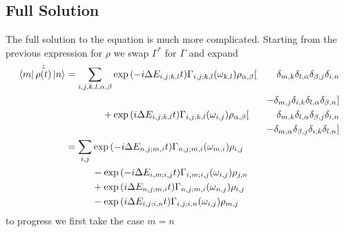 \subsection{Full Solution}
The full solution to the equation is
much more complicated. Starting from the
previous expression for \(\rho \) we
swap \(\Gamma^*\) for \(\Gamma \) and expand
\begin{align}
    \bra{m}\dot{\hat{\rho{}(t)}} \ket{n} & = \begin{aligned}[t]
        \sum_{i,j,k, l, \alpha, \beta} &
        \exp{(-i\Delta{}E_{i,j;k,l}t)}
        \Gamma_{i,j;k, l}(\omega_{k,l})
        \rho_{\alpha, \beta} [         &
            \delta_{m, k}\delta_{l, \alpha}
        \delta_{\beta, j}\delta_{i, n}       \\
                                       &   &
            -\delta_{m, j}\delta_{i, k}
        \delta_{l, \alpha}\delta_{\beta, n}] \\
        +                              &
        \exp{(i\Delta{}E_{i,j;k,l} t)}
        \Gamma_{i,j; k, l}(\omega_{i,j})
        \rho_{\alpha, \beta} [         &
            \delta_{m, k}\delta_{l, \alpha}
        \delta_{\beta, j}\delta_{i, n}       \\
                                       &   &
            - \delta_{m, \alpha}\delta_{\beta, j}
            \delta_{i, k}\delta_{l, n}]
    \end{aligned} \\
                                         & = \begin{aligned}[t]
        \sum_{i,j} &
        \exp{(-i\Delta{}E_{n,j;m,i} t)}
        \Gamma_{n,j;m, i}(\omega_{m,i})
        \rho_{i,j}   \\
                   &
        -\exp{(-i\Delta{}E_{i,m;i,j} t)}
        \Gamma_{i,m;i, j}(\omega_{i,j})
        \rho_{j, n}  \\
                   &
        +\exp{(i\Delta{}E_{n,j;m,i} t)}
        \Gamma_{n,j; m, i}(\omega_{n,j})
        \rho_{i, j}  \\
                   &
        -\exp{(i\Delta{}E_{i,j;i,n} t)}
        \Gamma_{i,j; i, n}(\omega_{i,j})
        \rho_{m, j}
    \end{aligned}
\end{align}
to progress we first take the case \(m=n\)
